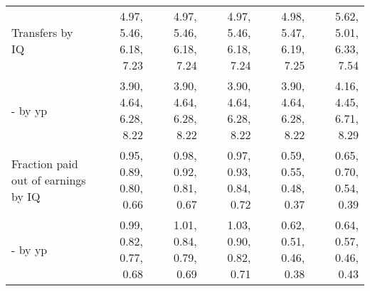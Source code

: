 \begin{tabular}{lrrrrr}
Transfers by IQ & 4.97, 5.46, 6.18, 7.23  & 4.97, 5.46, 6.18, 7.24  & 4.97, 5.46, 6.18, 7.24  & 4.98, 5.47, 6.19, 7.25  & 5.62, 5.01, 6.33, 7.54  \\ 
- by yp & 3.90, 4.64, 6.28, 8.22  & 3.90, 4.64, 6.28, 8.22  & 3.90, 4.64, 6.28, 8.22  & 3.90, 4.64, 6.28, 8.22  & 4.16, 4.45, 6.71, 8.29  \\ 
Fraction paid out of earnings by IQ & 0.95, 0.89, 0.80, 0.66  & 0.98, 0.92, 0.81, 0.67  & 0.97, 0.93, 0.84, 0.72  & 0.59, 0.55, 0.48, 0.37  & 0.65, 0.70, 0.54, 0.39  \\ 
- by yp & 0.99, 0.82, 0.77, 0.68  & 1.01, 0.84, 0.79, 0.69  & 1.03, 0.90, 0.82, 0.71  & 0.62, 0.51, 0.46, 0.38  & 0.64, 0.57, 0.46, 0.43  \\ 
\hline
\end{tabular}%
